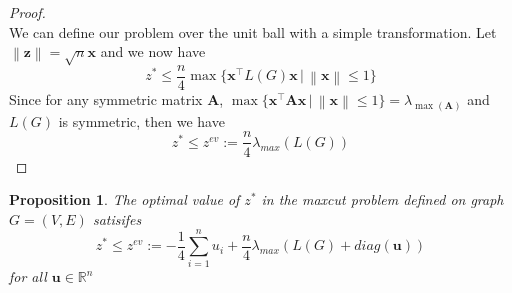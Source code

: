 \documentclass[12pt]{article}
\theoremstyle{plain}
\newtheorem{prop}{Proposition}
\theoremstyle{definition}
\newcommand{\norm}[1]{\left\lVert#1\right\rVert}
\begin{document}
\begin{proof}
\begin{equation}
    \end{equation}    
    We can define our problem over the unit ball with a simple transformation. Let $\norm{\mathbf{z}} = \sqrt{n} \mathbf{x}$ and
    we now have
    \begin{equation}
        z^* \leq \frac{n}{4} \max \lbrace \mathbf{x}^\top L(G) \mathbf{x} \,|\, \norm{\mathbf{x}} \leq 1 \rbrace
    \end{equation}  
    Since for any symmetric matrix $\mathbf{A}$, $\max\lbrace \mathbf{x}^\top \mathbf{A} \mathbf{x}\,|\, \norm{\mathbf{x}} \leq 1 \rbrace = \lambda_{\max(\mathbf{A})}$ 
    and $L(G)$ is symmetric, then we have 
    \begin{equation}
    z^* \leq z^{ev} := \dfrac{n}{4} \lambda_{max}(L(G))
    \end{equation}
\end{proof}



\begin{prop}
    The optimal value of $z^*$ in the maxcut problem defined on graph $G=(V,E)$ satisifes
    \[
        z^* \leq z^{ev} := - \frac{1}{4}\sum_{i=1}^n u_i + \dfrac{n}{4} \lambda_{max}(L(G) + diag(\mathbf{u}))
    \]
    for all $\mathbf{u} \in \mathbb{R}^n$
\end{prop}
\end{document}
